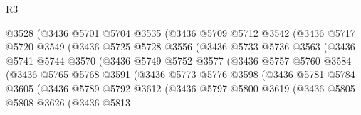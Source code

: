 \begin{lexlean}{R3}
\begin{coremodule}
                        @3528
                        (@3436
                          @5701
                          @5704
                          @3535
                          (@3436
                            @5709
                            @5712
                            @3542
                            (@3436
                              @5717
                              @5720
                              @3549
                              (@3436
                                @5725
                                @5728
                                @3556
                                (@3436
                                  @5733
                                  @5736
                                  @3563
                                  (@3436
                                    @5741
                                    @5744
                                    @3570
                                    (@3436
                                      @5749
                                      @5752
                                      @3577
                                      (@3436
                                        @5757
                                        @5760
                                        @3584
                                        (@3436
                                          @5765
                                          @5768
                                          @3591
                                          (@3436
                                            @5773
                                            @5776
                                            @3598
                                            (@3436
                                              @5781
                                              @5784
                                              @3605
                                              (@3436
                                                @5789
                                                @5792
                                                @3612
                                                (@3436
                                                  @5797
                                                  @5800
                                                  @3619
                                                  (@3436
                                                    @5805
                                                    @5808
                                                    @3626
                                                    (@3436
                                                      @5813

\end{coremodule}
\end{lexlean}
